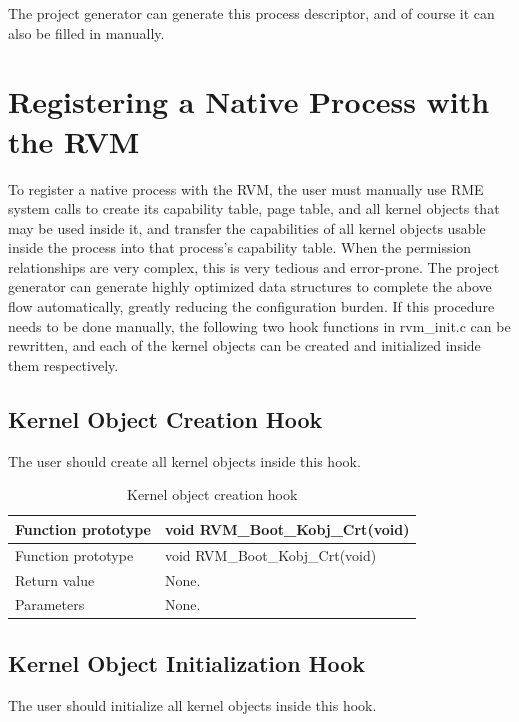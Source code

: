 The project generator can generate this process descriptor, and of course it can also be filled in manually.

\section{Registering a Native Process with the RVM}\label{sec:3-3}

To register a native process with the RVM, the user must manually use RME system calls to create its capability table, page table, and all kernel objects that may be used inside it, and transfer the capabilities of all kernel objects usable inside the process into that process's capability table. When the permission relationships are very complex, this is very tedious and error-prone. The project generator can generate highly optimized data structures to complete the above flow automatically, greatly reducing the configuration burden. If this procedure needs to be done manually, the following two hook functions in rvm\_init.c can be rewritten, and each of the kernel objects can be created and initialized inside them respectively.

\subsection{Kernel Object Creation Hook}\label{subsec:3-3-1}

The user should create all kernel objects inside this hook.

\begin{xltabular}{\textwidth}{@{}>{\hsize\raggedright\arraybackslash}X>{\hsize\raggedright\arraybackslash}X@{}}
\caption{Kernel object creation hook}\label{tab:3-2}\\
\toprule
Function prototype & void RVM\_\allowbreak{}Boot\_\allowbreak{}Kobj\_\allowbreak{}Crt(void)\tabularnewline
\endfirsthead
\toprule
Function prototype & void RVM\_\allowbreak{}Boot\_\allowbreak{}Kobj\_\allowbreak{}Crt(void)\tabularnewline
\midrule
\endhead
\bottomrule
\endlastfoot
Return value & None.\tabularnewline
Parameters & None.\tabularnewline
\end{xltabular}

\subsection{Kernel Object Initialization Hook}\label{subsec:3-3-2}

The user should initialize all kernel objects inside this hook.

